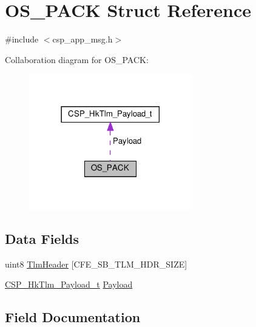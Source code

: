 \hypertarget{structOS__PACK}{}\section{O\+S\+\_\+\+P\+A\+CK Struct Reference}
\label{structOS__PACK}


{\ttfamily \#include $<$csp\+\_\+app\+\_\+msg.\+h$>$}



Collaboration diagram for O\+S\+\_\+\+P\+A\+CK\+:
\nopagebreak
\begin{figure}[H]
\begin{center}
\leavevmode
\includegraphics[width=201pt]{structOS__PACK__coll__graph}
\end{center}
\end{figure}
\subsection*{Data Fields}
\begin{DoxyCompactItemize}
\item 
uint8 \hyperlink{structOS__PACK_a1c4c26522f6f0f8d81db9e32929e93f7}{Tlm\+Header} \mbox{[}C\+F\+E\+\_\+\+S\+B\+\_\+\+T\+L\+M\+\_\+\+H\+D\+R\+\_\+\+S\+I\+ZE\mbox{]}
\item 
\hyperlink{structCSP__HkTlm__Payload__t}{C\+S\+P\+\_\+\+Hk\+Tlm\+\_\+\+Payload\+\_\+t} \hyperlink{structOS__PACK_a5e04ccc4ba9f037b8ac9108da56f0d2e}{Payload}
\end{DoxyCompactItemize}


\subsection{Field Documentation}
\mbox{\label{structOS__PACK_a5e04ccc4ba9f037b8ac9108da56f0d2e}} 
